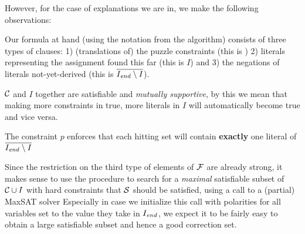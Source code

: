 However, for the case of explanations we are in, we make the following observations: 
\begin{compactitem}
 \item Our formula at hand (using the notation from the \onestepo algorithm) consists of three types of clauses: 1) (translations of) the puzzle constraints (this is \formulac) 2) literals representing the assignment found this far (this is $I$) and 3) the negations of literals not-yet-derived (this is $\overline{I_\mathit{end} \setminus I}$). 
 \item $\mathcal{C} $ and $I$ together are satisfiable and \emph{mutually supportive}, by this we mean that making more constraints in \formulac true, more literals in $I$ will automatically become true and vice versa. 
 \item The constraint $p$ enforces that each hitting set will contain \textbf{exactly} one literal of  $\overline{I_\mathit{end} \setminus I}$
\end{compactitem}
Since the restriction on the third type of elements of $\mathcal{F} $ are already strong, it makes sense to use the \grow procedure to search for a \emph{maximal} satisfiable subset of $\mathcal{C} \cup I$ with hard constraints that $\mathcal{S}$ should be satisfied, using a call to a  (partial) MaxSAT solver Especially in case we initialize this call with  polarities for all variables set to the value they take in $I_\mathit{end} $, we expect it to be fairly easy to obtain a large satisfiable subset and hence a good correction set. 






